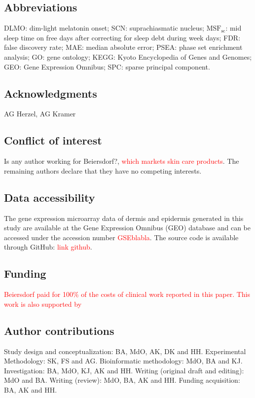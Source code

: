 \subsection*{Abbreviations}
DLMO: dim-light melatonin onset; SCN: suprachiasmatic nucleus; $\textrm{MSF}_\textrm{sc}$: mid sleep time on free days after correcting for sleep debt during week days; FDR: false discovery rate; MAE: median absolute error; PSEA: phase set enrichment analysis; GO: gene ontology; KEGG: Kyoto Encyclopedia of Genes and Genomes; GEO: Gene Expression Omnibus; SPC: sparse principal component.

\subsection*{Acknowledgments}
AG Herzel, AG Kramer

\subsection*{Conflict of interest}
Is any author working for Beiersdorf?, \textcolor{red}{which markets skin care products}. The remaining authors declare that they have no competing interests. 


\subsection*{Data accessibility}
The gene expression microarray data of dermis and epidermis generated in this study are available at the Gene Expression Omnibus (GEO) database and can be accessed under the accession number \textcolor{red}{GSEblabla}. The source code is available through GitHub: \textcolor{red}{link github}. 

\subsection*{Funding}
\textcolor{red}{Beiersdorf paid for 100\% of the costs of clinical work reported in this paper. This work is also supported by } 

\subsection*{Author contributions}
Study design and conceptualization: BA, MdO, AK, DK and HH. Experimental Methodology: SK, FS and AG. Bioinformatic methodology: MdO, BA and KJ. Investigation: BA, MdO, KJ, AK and HH. Writing (original draft and editing): MdO and BA. Writing (review): MdO, BA, AK and HH. Funding acquisition: BA, AK and HH. 

